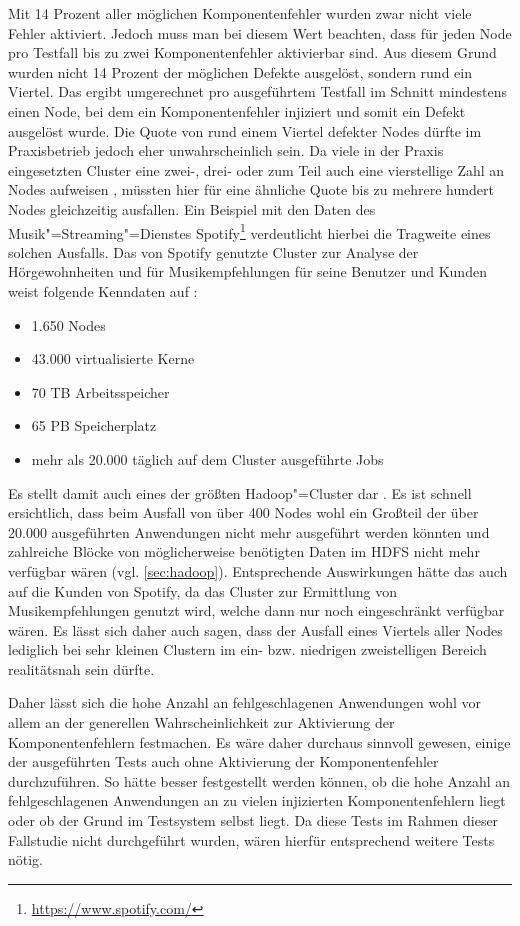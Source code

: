 Mit 14 Prozent aller möglichen Komponentenfehler wurden zwar nicht viele Fehler aktiviert.
Jedoch muss man bei diesem Wert beachten, dass für jeden Node pro Testfall bis zu zwei Komponentenfehler aktivierbar sind.
Aus diesem Grund wurden nicht 14 Prozent der möglichen Defekte ausgelöst, sondern rund ein Viertel.
Das ergibt umgerechnet pro ausgeführtem Testfall im Schnitt mindestens einen Node, bei dem ein Komponentenfehler injiziert und somit ein Defekt ausgelöst wurde.
Die Quote von rund einem Viertel defekter Nodes dürfte im Praxisbetrieb jedoch eher unwahrscheinlich sein.
Da viele in der Praxis eingesetzten Cluster eine zwei-, drei- oder zum Teil auch eine vierstellige Zahl an Nodes aufweisen \cite{PoweredByHadoop}, müssten hier für eine ähnliche Quote bis zu mehrere hundert Nodes gleichzeitig ausfallen.
Ein Beispiel mit den Daten des Musik"=Streaming"=Dienstes Spotify\footnote{\url{https://www.spotify.com/}} verdeutlicht hierbei die Tragweite eines solchen Ausfalls.
Das von Spotify genutzte Cluster zur Analyse der Hörgewohnheiten und für Musikempfehlungen für seine Benutzer und Kunden weist folgende Kenndaten auf \cite{PoweredByHadoop}:

\begin{itemize}
    \item 1.650 Nodes
    \item 43.000 virtualisierte Kerne
    \item 70 TB Arbeitsspeicher
    \item 65 PB Speicherplatz
    \item mehr als 20.000 täglich auf dem Cluster ausgeführte Jobs
\end{itemize}

Es stellt damit auch eines der größten Hadoop"=Cluster dar \cite{PoweredByHadoop}.
Es ist schnell ersichtlich, dass beim Ausfall von über 400 Nodes wohl ein Großteil der über 20.000 ausgeführten Anwendungen nicht mehr ausgeführt werden könnten und zahlreiche Blöcke von möglicherweise benötigten Daten im HDFS nicht mehr verfügbar wären (vgl. \cref{sec:hadoop}).
Entsprechende Auswirkungen hätte das auch auf die Kunden von Spotify, da das Cluster \uA zur Ermittlung von Musikempfehlungen genutzt wird, welche dann nur noch eingeschränkt verfügbar wären.
Es lässt sich daher auch sagen, dass der Ausfall eines Viertels aller Nodes lediglich bei sehr kleinen Clustern im ein- bzw. niedrigen zweistelligen Bereich realitätsnah sein dürfte.

Daher lässt sich die hohe Anzahl an fehlgeschlagenen Anwendungen wohl vor allem an der generellen Wahrscheinlichkeit zur Aktivierung der Komponentenfehlern festmachen.
Es wäre daher durchaus sinnvoll gewesen, einige der ausgeführten Tests auch ohne Aktivierung der Komponentenfehler durchzuführen.
So hätte besser festgestellt werden können, ob die hohe Anzahl an fehlgeschlagenen Anwendungen an zu vielen injizierten Komponentenfehlern liegt oder ob der Grund im Testsystem selbst liegt.
Da diese Tests im Rahmen dieser Fallstudie nicht durchgeführt wurden, wären hierfür entsprechend weitere Tests nötig.

